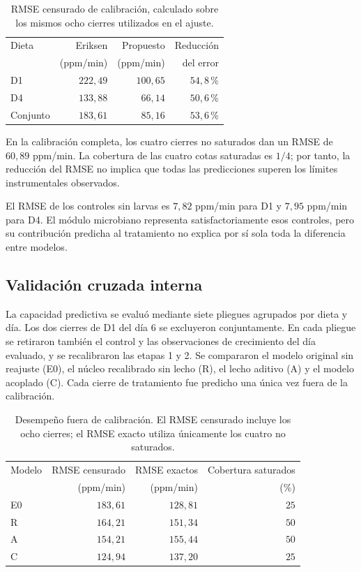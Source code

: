 \begin{table}[H]
\centering
\caption{RMSE censurado de calibración, calculado sobre los mismos
ocho cierres utilizados en el ajuste.}
\begin{tabular}{l r r r}
\toprule
Dieta & Eriksen & Propuesto & Reducción \\
 & (ppm/min) & (ppm/min) & del error \\
\midrule
D1 & $222{,}49$ & $100{,}65$ & $54{,}8$\,\% \\
D4 & $133{,}88$ & $66{,}14$ & $50{,}6$\,\% \\
Conjunto & $183{,}61$ & $85{,}16$ & $53{,}6$\,\% \\
\bottomrule
\end{tabular}
\end{table}

En la calibración completa, los cuatro cierres no saturados dan un RMSE
de $60{,}89$ ppm/min. La cobertura de las cuatro cotas saturadas es
$1/4$; por tanto, la reducción del RMSE no implica que todas las
predicciones superen los límites instrumentales observados.

El RMSE de los controles sin larvas es $7{,}82$ ppm/min para D1 y
$7{,}95$ ppm/min para D4. El módulo microbiano representa
satisfactoriamente esos controles, pero su contribución predicha al
tratamiento no explica por sí sola toda la diferencia entre modelos.

\subsection{Validación cruzada interna}

La capacidad predictiva se evaluó mediante siete pliegues agrupados por
dieta y día. Los dos cierres de D1 del día 6 se excluyeron conjuntamente.
En cada pliegue se retiraron también el control y las observaciones de
crecimiento del día evaluado, y se recalibraron las etapas 1 y 2. Se
compararon el modelo original sin reajuste (E0), el núcleo recalibrado sin
lecho (R), el lecho aditivo (A) y el modelo acoplado (C). Cada cierre de
tratamiento fue predicho una única vez fuera de la calibración.

\begin{table}[H]
\centering
\small
\caption{Desempeño fuera de calibración. El RMSE censurado incluye los
ocho cierres; el RMSE exacto utiliza únicamente los cuatro no saturados.}
\begin{tabular}{l r r r}
\toprule
Modelo & RMSE censurado & RMSE exactos & Cobertura saturados \\
 & (ppm/min) & (ppm/min) & (\%) \\
\midrule
E0 & $183{,}61$ & $128{,}81$ & $25$ \\
R  & $164{,}21$ & $151{,}34$ & $50$ \\
A  & $154{,}21$ & $155{,}44$ & $50$ \\
C  & $124{,}94$ & $137{,}20$ & $25$ \\
\bottomrule
\end{tabular}
\label{tab:validacion_cruzada}
\end{table}

